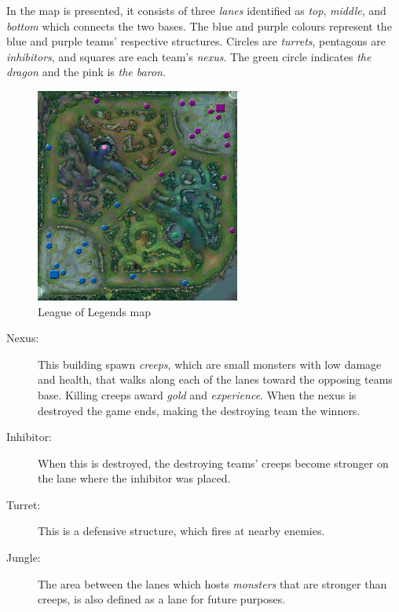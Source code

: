 In  the map is presented, it consists of three \emph{lanes} identified as \emph{top}, \emph{middle}, and \emph{bottom} which connects the two bases. The blue and purple colours represent the blue and purple teams' respective structures. Circles are \emph{turrets}, pentagons are \emph{inhibitors}, and squares are each team's \emph{nexus}. The green circle indicates \emph{the dragon} and the pink is \emph{the baron}.

\begin{figure}[!htb]
  \centering
    \includegraphics[width=0.6\textwidth]{img/lolmap.jpg}
  \caption{League of Legends map~\cite{lolmap}}\label{fig:lolmap}
\end{figure}

\begin{description}
  \item[Nexus:] This building spawn \emph{creeps}, which are small monsters with low damage and health, that walks along each of the lanes toward the opposing teams base. Killing creeps award \emph{gold} and \emph{experience}. When the nexus is destroyed the game ends, making the destroying team the winners.
  \item[Inhibitor:] When this is destroyed, the destroying teams' creeps become stronger on the lane where the inhibitor was placed.
  \item[Turret:] This is a defensive structure, which fires at nearby enemies.
  \item[Jungle:] The area between the lanes which hosts \emph{monsters} that are stronger than creeps, is also defined as a lane for future purposes.
\end{description}

